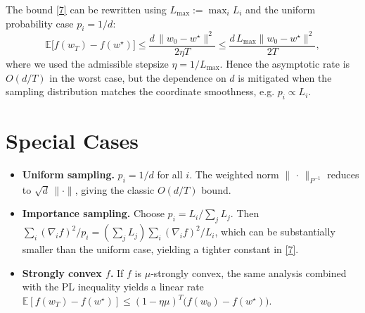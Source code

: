 \documentclass{article}
\newcommand{\E}{\mathbb{E}}
\begin{document}
The bound \eqref{7} can be rewritten using
$L_{\max}:=\max_i L_i$ and the uniform probability case $p_i=1/d$:
\[
\E\big[f(w_T)-f(w^\star)\big]\le
\frac{d\,\|w_0-w^\star\|^{2}}{2\eta T}
\le\frac{d\,L_{\max}\|w_0-w^\star\|^{2}}{2T},
\]
where we used the admissible stepsize $\eta=1/L_{\max}$.  Hence the
asymptotic rate is $O(d/T)$ in the worst case, but the dependence on $d$
is mitigated when the sampling distribution matches the coordinate
smoothness, e.g. $p_i\propto L_i$.

\section*{Special Cases}

\begin{itemize}[leftmargin=*]
\item \textbf{Uniform sampling.} $p_i=1/d$ for all $i$.  The weighted norm
$\|\,\cdot\,\|_{P^{-1}}$ reduces to $\sqrt{d}\,\|\cdot\|$, giving the classic
$O(d/T)$ bound.

\item \textbf{Importance sampling.} Choose $p_i = L_i/\sum_j L_j$.
Then $\sum_i (\nabla_i f)^2/p_i = (\sum_j L_j)\sum_i (\nabla_i f)^2/L_i$,
which can be substantially smaller than the uniform case, yielding a
tighter constant in \eqref{7}.

\item \textbf{Strongly convex $f$.} If $f$ is $\mu$‑strongly convex,
the same analysis combined with the PL inequality yields a linear rate
$\E[f(w_T)-f(w^\star)]\le (1-\eta\mu)^T\big(f(w_0)-f(w^\star)\big)$.
\end{itemize}

\end{document}
